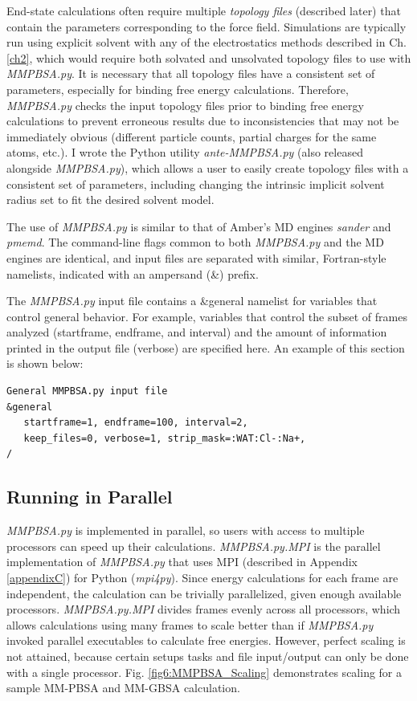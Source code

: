 End-state calculations often require multiple \emph{topology files} (described
later) that contain the parameters corresponding to the force field. Simulations
are typically run using explicit solvent with any of the electrostatics methods
described in Ch. \ref{ch2}, which would require both solvated and unsolvated
topology files to use with \emph{MMPBSA.py}. It is necessary that all topology
files have a consistent set of parameters, especially for binding free energy
calculations. Therefore, \emph{MMPBSA.py} checks the input topology files prior
to binding free energy calculations to prevent erroneous results due to
inconsistencies that may not be immediately obvious (\eg different particle
counts, partial charges for the same atoms, etc.). I wrote the Python utility
\emph{ante-MMPBSA.py} (also released alongside \emph{MMPBSA.py}), which allows a
user to easily create topology files with a consistent set of parameters,
including changing the intrinsic implicit solvent radius set to fit the desired
solvent model.

The use of \emph{MMPBSA.py} is similar to that of Amber's MD engines
\emph{sander} and \emph{pmemd}. The command-line flags common to both
\emph{MMPBSA.py} and the MD engines are identical, and input files are separated
with similar, Fortran-style namelists, indicated with an ampersand (\&) prefix.

The \emph{MMPBSA.py} input file contains a &general namelist for variables that
control general behavior. For example, variables that control the subset of
frames analyzed (startframe, endframe, and interval) and the amount of
information printed in the output file (verbose) are specified here. An example
of this section is shown below:
\begin{verbatim}
General MMPBSA.py input file
&general
   startframe=1, endframe=100, interval=2,
   keep_files=0, verbose=1, strip_mask=:WAT:Cl-:Na+,
/
\end{verbatim}

\subsection{Running in Parallel}

\emph{MMPBSA.py} is implemented in parallel, so users with access to multiple
processors can speed up their calculations. \emph{MMPBSA.py.MPI} is the parallel
implementation of \emph{MMPBSA.py} that uses MPI (described in Appendix
\ref{appendixC}) for Python (\emph{mpi4py}). Since energy calculations for each
frame are independent, the calculation can be trivially parallelized, given
enough available processors. \emph{MMPBSA.py.MPI} divides frames evenly across
all processors, which allows calculations using many frames to scale better than
if \emph{MMPBSA.py} invoked parallel executables to calculate free energies.
However, perfect scaling is not attained, because certain setups tasks and file
input/output can only be done with a single processor. Fig.
\ref{fig6:MMPBSA_Scaling} demonstrates scaling for a sample MM-PBSA and MM-GBSA
calculation.

